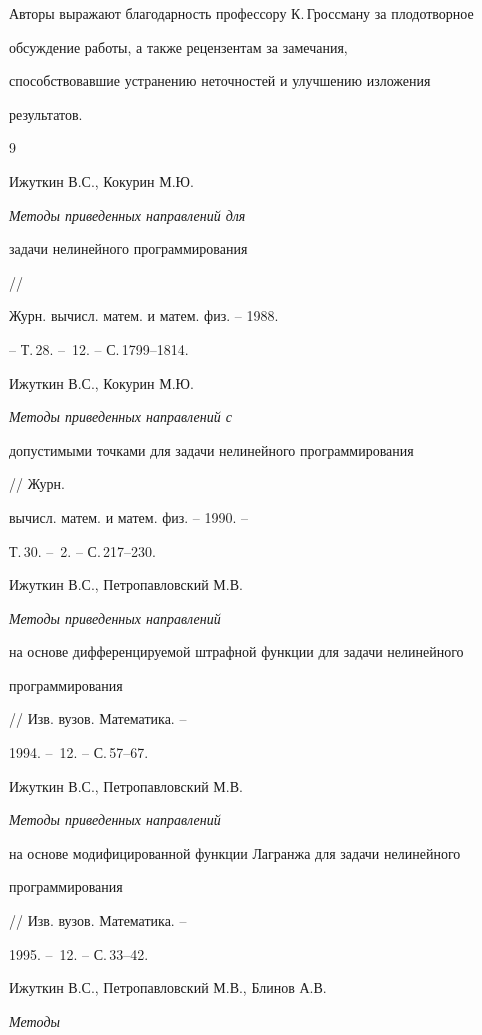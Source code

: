  


Авторы выражают благодарность профессору К.\,Гроссману за плодотворное 


обсуждение работы, а также рецензентам за замечания, 


способствовавшие устранению неточностей и улучшению изложения 


результатов. 


 


\begin{thebibliography}{9} 


 




Ижуткин В.С., Кокурин М.Ю. {\em Методы приведенных направлений для 


задачи нелинейного программирования} // 


Журн. вычисл. матем. и матем. физ. -- 1988. 


-- Т.\,28. -- \No\,12. -- С.\,1799--1814. 




Ижуткин В.С., Кокурин М.Ю. {\em Методы приведенных направлений с 


допустимыми точками для задачи нелинейного программирования} // Журн. 


вычисл. матем. и матем. физ. -- 1990. -- 


Т.\,30. -- \No\,2. -- С.\,217--230. 




Ижуткин В.С., Петропавловский М.В. {\em Методы приведенных направлений 


на основе дифференцируемой штрафной функции для задачи нелинейного 


программирования} // Изв. вузов. Математика. -- 


1994. -- \No\,12. -- С.\,57--67. 




Ижуткин В.С., Петропавловский М.В. {\em Методы приведенных направлений 


на основе модифицированной функции Лагранжа для задачи нелинейного 


программирования} // Изв. вузов. Математика. -- 


1995. -- \No\,12. -- С.\,33--42. 




Ижуткин В.С., Петропавловский М.В., Блинов А.В. {\em Методы 


}
\end{thebibliography}
